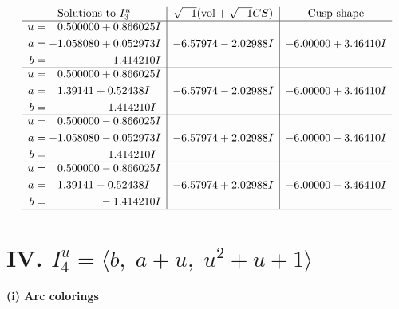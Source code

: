 \documentclass[1p]{elsarticle_modified}
\theoremstyle{definition}
\newcommand{\I}{\sqrt{-1}}
\begin{document}
$$\begin{array}{c|c|c}  
\text{Solutions to }I^u_{3}& \I (\text{vol} + \sqrt{-1}CS) & \text{Cusp shape}\\
 \hline 
\begin{aligned}
u &= \phantom{-}0.500000 + 0.866025 I \\
a &= -1.058080 + 0.052973 I \\
b &= \phantom{-0.000000 } -1.414210 I\end{aligned}
 & -6.57974 - 2.02988 I & -6.00000 + 3.46410 I \\ \hline\begin{aligned}
u &= \phantom{-}0.500000 + 0.866025 I \\
a &= \phantom{-}1.39141 + 0.52438 I \\
b &= \phantom{-0.000000 -}1.414210 I\end{aligned}
 & -6.57974 - 2.02988 I & -6.00000 + 3.46410 I \\ \hline\begin{aligned}
u &= \phantom{-}0.500000 - 0.866025 I \\
a &= -1.058080 - 0.052973 I \\
b &= \phantom{-0.000000 -}1.414210 I\end{aligned}
 & -6.57974 + 2.02988 I & -6.00000 - 3.46410 I \\ \hline\begin{aligned}
u &= \phantom{-}0.500000 - 0.866025 I \\
a &= \phantom{-}1.39141 - 0.52438 I \\
b &= \phantom{-0.000000 } -1.414210 I\end{aligned}
 & -6.57974 + 2.02988 I & -6.00000 - 3.46410 I\\
 \hline 
 \end{array}$$\newpage\newpage\renewcommand{\arraystretch}{1}
\centering \section*{IV. $I^u_{4}= \langle b,\;a+u,\;u^2+u+1 \rangle$}
\flushleft \textbf{(i) Arc colorings}\\
\end{document}
